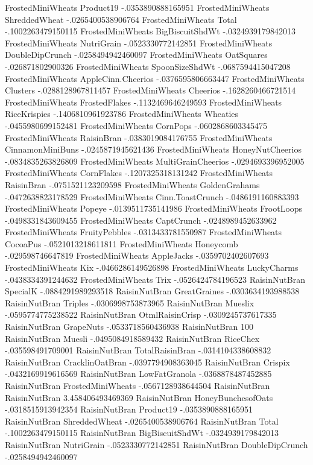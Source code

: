 FrostedMiniWheats	Product19	-.0353890888165951
FrostedMiniWheats	ShreddedWheat	-.0265400538906764
FrostedMiniWheats	Total	-.1002263479150115
FrostedMiniWheats	BigBiscuitShdWt	-.0324939179842013
FrostedMiniWheats	NutriGrain	-.0523330772142851
FrostedMiniWheats	DoubleDipCrunch	-.0258494942460097
FrostedMiniWheats	OatSquares	-.026871802900326
FrostedMiniWheats	SpoonSizeShdWt	-.0687594415047208
FrostedMiniWheats	AppleCinn.Cheerios	-.0376595806663447
FrostedMiniWheats	Clusters	-.0288128967811457
FrostedMiniWheats	Cheerios	-.1628260466721514
FrostedMiniWheats	FrostedFlakes	-.1132469646249593
FrostedMiniWheats	RiceKrispies	-.1406810961923786
FrostedMiniWheats	Wheaties	-.0455980699152481
FrostedMiniWheats	CornPops	-.0602868603345475
FrostedMiniWheats	RaisinBran	-.0383019084176755
FrostedMiniWheats	CinnamonMiniBuns	-.0245871945621436
FrostedMiniWheats	HoneyNutCheerios	-.0834835263826809
FrostedMiniWheats	MultiGrainCheerios	-.0294693396952005
FrostedMiniWheats	CornFlakes	-.1207325318131242
FrostedMiniWheats	RaisinBran	-.0751521123209598
FrostedMiniWheats	GoldenGrahams	-.0472638823178529
FrostedMiniWheats	Cinn.ToastCrunch	-.0486191160883393
FrostedMiniWheats	Popeye	-.0139511735141986
FrostedMiniWheats	FrootLoops	-.0498331843609455
FrostedMiniWheats	CaptCrunch	-.0248989452633962
FrostedMiniWheats	FruityPebbles	-.0313433781550987
FrostedMiniWheats	CocoaPus	-.0521013218611811
FrostedMiniWheats	Honeycomb	-.029598746647819
FrostedMiniWheats	AppleJacks	-.0359702402607693
FrostedMiniWheats	Kix	-.0466286149526898
FrostedMiniWheats	LuckyCharms	-.0438334391244632
FrostedMiniWheats	Trix	-.0526424784196523
RaisinNutBran	SpecialK	-.0884291989293518
RaisinNutBran	GreatGraines	-.0303634193988538
RaisinNutBran	Triples	-.0306998753873965
RaisinNutBran	Mueslix	-.0595774775238522
RaisinNutBran	OtmlRaisinCrisp	-.0309245737617335
RaisinNutBran	GrapeNuts	-.0533718560436938
RaisinNutBran	100%
RaisinNutBran	Muesli	-.0495084918589432
RaisinNutBran	RiceChex	-.035598491709001
RaisinNutBran	TotalRaisinBran	-.0314104338608832
RaisinNutBran	CracklinOatBran	-.0397794908363045
RaisinNutBran	Crispix	-.0432169919616569
RaisinNutBran	LowFatGranola	-.0368878487452885
RaisinNutBran	FrostedMiniWheats	-.0567128938644504
RaisinNutBran	RaisinNutBran	3.458406493469369
RaisinNutBran	HoneyBunchesofOats	-.0318515913942354
RaisinNutBran	Product19	-.0353890888165951
RaisinNutBran	ShreddedWheat	-.0265400538906764
RaisinNutBran	Total	-.1002263479150115
RaisinNutBran	BigBiscuitShdWt	-.0324939179842013
RaisinNutBran	NutriGrain	-.0523330772142851
RaisinNutBran	DoubleDipCrunch	-.0258494942460097
